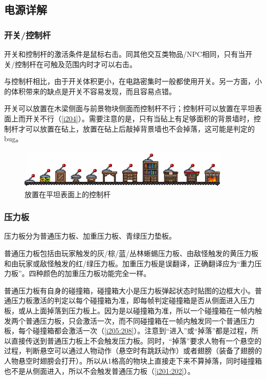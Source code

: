\subsection{电源详解}\label{sec1}
\minitoc
\subsubsection{开关/控制杆}
开关和控制杆的激活条件是鼠标右击。同其他交互类物品/NPC相同，只有当开关/控制杆在可触及范围内时才可以右击。

与控制杆相比，由于开关体积更小，在电路密集时一般都使用开关。另一方面，小的体积带来的缺点是开关不容易发现，而且容易点错。

开关可以放置在木梁侧面与前景物块侧面而控制杆不行；控制杆可以放置在平坦表面上而开关不行（\autoref{i204}）。需要注意的是，只有当砧上有足够面积的背景墙时，控制杆才可以放置在砧上，放置在砧上后敲掉背景墙也不会掉落，这可能是判定的bug。

\begin{figure}[!h]
\centering
\includegraphics[width=0.9\textwidth]{images/204.png}
\caption{放置在平坦表面上的控制杆}
\label{i204}
\end{figure}

\subsubsection{压力板}
压力板分为普通压力板、加重压力板、青绿压力垫板。

普通压力板包括由玩家触发的灰/棕/蓝/丛林蜥蜴压力板、由敌怪触发的黄压力板和由玩家或敌怪触发的红/绿压力板。加重压力板是误翻译，正确翻译应为“重力压力板”。四种颜色的加重压力板功能完全一样。

普通压力板有自身的碰撞箱，碰撞箱大小是压力板弹起状态时贴图的边框大小。普通压力板激活的判定以每个碰撞箱为准，即每帧判定碰撞箱是否从侧面进入压力板，或从上面掉落到压力板上。因为是以碰撞箱为准，所以一个碰撞箱在一帧内触发两个普通压力板，只会激活一次，而不同碰撞箱在一帧内触发同一个普通压力板，每个碰撞箱都会激活一次（\autoref{i205:208}）。注意到“进入”或“掉落”都是过程，所以直接传送到普通压力板上不会触发压力板。同时，“掉落”要求人物有一个悬空的过程，判断悬空可以通过人物动作（悬空时有跳跃动作）或者翅膀（装备了翅膀的人物悬空时翅膀会打开）。所以从1格高的物块上直接走下来不算掉落，同时碰撞箱也不是从侧面进入，所以不会触发普通压力板（\autoref{i201:202}）。

